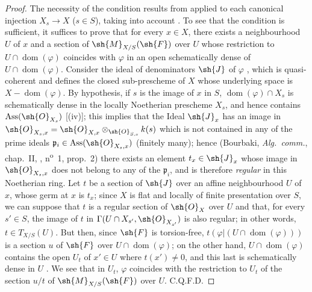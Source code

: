 \begin{proof}
The necessity of the condition results from  applied to each canonical injection $X_s\to X$ ($s\in S$), taking into account .
To see that the condition is sufficient, it suffices to prove that for every $x\in X$, there exists a neighbourhood $U$ of $x$ and a section of $\sh{M}_{X/S}(\sh{F})$ over $U$ whose restriction to $U\cap\operatorname{dom}(\varphi)$ coincides with $\varphi$ in an open schematically dense of $U\cap\operatorname{dom}(\varphi)$.
Consider the ideal of denominators $\sh{J}$ of $\varphi$ , which is quasi-coherent and defines the closed sub-prescheme of $X$ whose underlying space is $X-\operatorname{dom}(\varphi)$.
By hypothesis, if $s$ is the image of $x$ in $S$, $\operatorname{dom}(\varphi)\cap X_s$ is schematically dense in the locally Noetherian prescheme $X_s$, and hence contains $\operatorname{Ass}(\sh{O}_{X_s})$ [(iv)];
this implies that the Ideal $\sh{J}_x$ has an image in $\sh{O}_{X_s,x}=\sh{O}_{X,x}\otimes_{\sh{O}_{S,s}}k(s)$ which is not contained in any of the prime ideals $\mathfrak{p}_i\in\operatorname{Ass}(\sh{O}_{X_s,x})$ (finitely many);
hence (Bourbaki, \emph{Alg.~comm.}, chap.~II, , n\textsuperscript{o}~1, prop.~2) there exists an element $t_x\in\sh{J}_x$ whose image in $\sh{O}_{X_s,x}$ does not belong to any of the $\mathfrak{p}_i$, and is therefore \emph{regular} in this Noetherian ring.
Let $t$ be a section of $\sh{J}$ over an affine neighbourhood $U$ of $x$, whose germ at $x$ is $t_x$;
since $X$ is flat and locally of finite presentation over $S$, we can suppose  that $t$ is a regular section of $\sh{O}_X$ over $U$ and that, for every $s'\in S$, the image of $t$ in $\Gamma(U\cap X_{s'},\sh{O}_{X_{s'}})$ is also regular;
in other words, $t\in T_{X/S}(U)$.
But then, since $\sh{F}$ is torsion-free, $t(\varphi|(U\cap\operatorname{dom}(\varphi)))$ is a section $u$ of $\sh{F}$ over $U\cap\operatorname{dom}(\varphi)$;
on the other hand, $U\cap\operatorname{dom}(\varphi)$ contains the open $U_t$ of $x'\in U$ where $t(x')\neq 0$, and this last is schematically dense in $U$ .
We see that in $U_t$, $\varphi$ coincides with the restriction to $U_t$ of the section $u/t$ of $\sh{M}_{X/S}(\sh{F})$ over $U$.
C.Q.F.D.
\end{proof}

